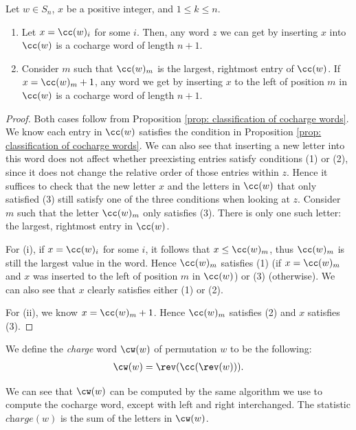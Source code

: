 \begin{lemma}\label{lemma: adding a repeated cocharge value is still a cc word}
Let $w\in S_n$, $x$ be a positive integer, and $1\leq k\leq n$. 
\begin{enumerate}[label=(\roman*)]
    \item Let $x = \cc(w)_i$ for some $i$. Then, any word $z$ we can get by inserting $x$ into $\cc(w)$ is a cocharge word of length $n+1$.
    \item Consider $m$ such that $\cc(w)_m$ is the largest, rightmost entry of $\cc(w)$. If $x = \cc(w)_m + 1$, any word we get by inserting $x$ to the left of position $m$ in $\cc(w)$ is a cocharge word of length $n+1$.
\end{enumerate}

\end{lemma}
\begin{proof}
Both cases follow from Proposition \ref{prop: classification of cocharge words}.
We know each entry in  $\cc(w)$ satisfies the condition in Proposition \ref{prop: classification of cocharge words}. We can also see that inserting a new letter into this word does not affect whether preexisting entries satisfy conditions (1) or (2), since it does not change the relative order of those entries within $z$. 
Hence it suffices to check that the new letter $x$ and the letters in $\cc(w)$ that only satisfied (3) still satisfy one of the three conditions when looking at $z$.
 Consider $m$ such that the letter $\cc(w)_m$ only satisfies (3). There is only one such letter: the largest, rightmost entry in $\cc(w)$. 

 For (i),  if $x = \cc(w)_i$ for some $i$, it follows that  $x \leq \cc(w)_m$, thus $\cc(w)_m$ is still the largest value in the word. Hence $\cc(w)_m$ satisfies (1) (if $x = \cc(w)_m$ and $x$ was inserted to the left of position $m$ in $\cc(w)$)  or (3) (otherwise). We can also see that $x$ clearly satisfies either (1) or (2).

 For (ii), we know $x = \cc(w)_m+1$. Hence $\cc(w)_m$ satisfies (2) and $x$ satisfies (3).   
\end{proof}


We define the \textit{charge} word $\cw(w)$ of permutation $w$ to be the following: 
\begin{align}\label{eq: charge is reverse of cocharge of reverse}
    \cw(w)  = \rev(\cc(\rev(w))).
\end{align}

We can see that $\cw(w)$ can be computed by the same algorithm we use to compute the cocharge word, except with left and right interchanged. The statistic $\textit{charge}(w)$  is the sum of the letters in $\cw(w)$. 

